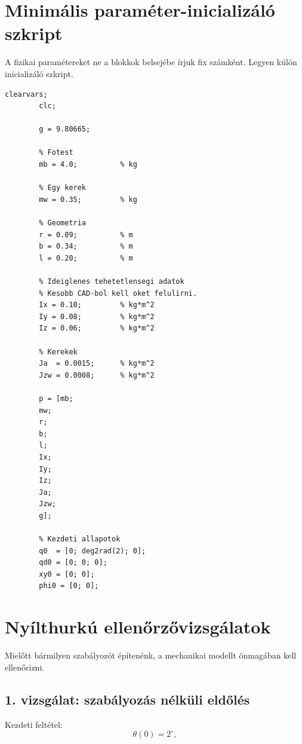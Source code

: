 \documentclass[12pt,a4paper]{article}
\begin{document}
	\section{Minimális paraméter-inicializáló szkript}
	
	A fizikai paramétereket ne a blokkok belsejébe írjuk fix számként. Legyen külön inicializáló szkript.
	
	\begin{lstlisting}[style=matlab,caption={Példa inicializáló szkript a mechanikai modellhez}]
		clearvars;
		clc;
		
		g = 9.80665;
		
		% Fotest
		mb = 4.0;          % kg
		
		% Egy kerek
		mw = 0.35;         % kg
		
		% Geometria
		r = 0.09;          % m
		b = 0.34;          % m
		l = 0.20;          % m
		
		% Ideiglenes tehetetlensegi adatok
		% Kesobb CAD-bol kell oket felulirni.
		Ix = 0.10;         % kg*m^2
		Iy = 0.08;         % kg*m^2
		Iz = 0.06;         % kg*m^2
		
		% Kerekek
		Ja  = 0.0015;      % kg*m^2
		Jzw = 0.0008;      % kg*m^2
		
		p = [mb;
		mw;
		r;
		b;
		l;
		Ix;
		Iy;
		Iz;
		Ja;
		Jzw;
		g];
		
		% Kezdeti allapotok
		q0  = [0; deg2rad(2); 0];
		qd0 = [0; 0; 0];
		xy0 = [0; 0];
		phi0 = [0; 0];
	\end{lstlisting}
	
	\section{Nyílthurkú ellenőrzővizsgálatok}
	
	Mielőtt bármilyen szabályozót építenénk, a mechanikai modellt önmagában kell ellenőrizni.
	
	\subsection{1. vizsgálat: szabályozás nélküli eldőlés}
	
	Kezdeti feltétel:
	\begin{equation}
		\theta(0)=2^\circ,
	\end{equation}
	
\end{document}

